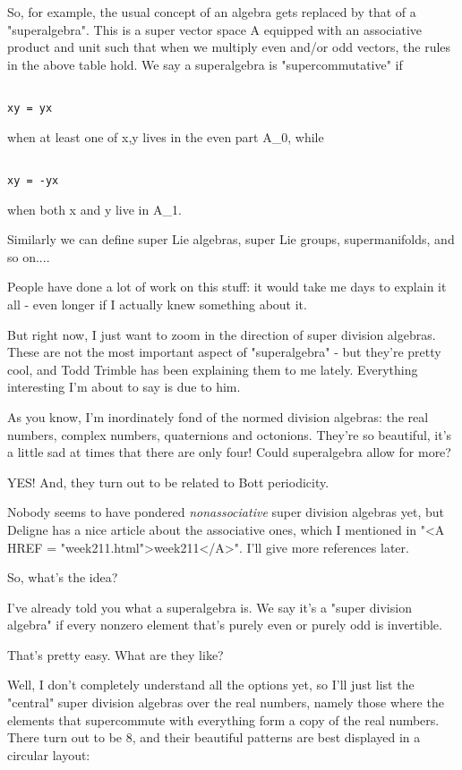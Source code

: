 So, for example, the usual concept of an algebra gets replaced 
by that of a "superalgebra".  This is a super vector space A
equipped with an associative product and unit such that when we
multiply even and/or odd vectors, the rules in the above table hold. 
We say a superalgebra is "supercommutative" if 


\begin{verbatim}

xy = yx
\end{verbatim}
    
when at least one of x,y lives in the even part A_{0}, while 


\begin{verbatim}

xy = -yx
\end{verbatim}
    
when both x and y live in A_{1}.   

Similarly we can define super Lie algebras, super Lie groups, 
supermanifolds, and so on.... 

People have done a lot of work on this stuff: it would take me days to 
explain it all - even longer if I actually knew something about it.  

But right now, I just want to zoom in the direction of super division 
algebras.  These are not the most important aspect of 
"superalgebra" - 
but they're pretty cool, and Todd Trimble has been explaining them to
me lately.  Everything interesting I'm about to say is due to him.

As you know, I'm inordinately fond of the normed division algebras:
the real numbers, complex numbers, quaternions and octonions.  They're
so beautiful, it's a little sad at times that there are only four!
Could superalgebra allow for more?

YES!  And, they turn out to be related to Bott periodicity.

Nobody seems to have pondered \emph{nonassociative} super division algebras 
yet, but Deligne has a nice article about the associative ones, which
I mentioned in "<A HREF = "week211.html">week211</A>".  I'll 
give more references later.

So, what's the idea?

I've already told you what a superalgebra is.  We say it's a "super 
division algebra" if every nonzero element that's purely even or 
purely odd is invertible.  

That's pretty easy.  What are they like?  

Well, I don't completely understand all the options yet, so I'll
just list the "central" super division algebras over the 
real numbers, 
namely those where the elements that supercommute with everything
form a copy of the real numbers.  There turn out to be 8, and their
beautiful patterns are best displayed in a circular layout:



